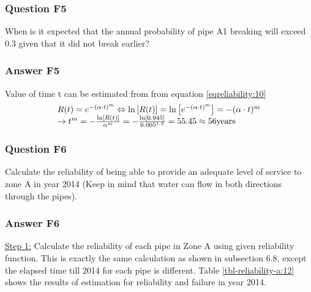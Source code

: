 \subsubsection{Question F5}
When is it expected that the annual probability of pipe A1 breaking will exceed
0.3 given that it did not break earlier?

\subsubsection{Answer F5}
Value of time t can be estimated from from equation \eqref{eqreliability:10}
\[
\begin{array}{l}
R(t) = {e^{ - {{(\alpha  \cdot t)}^m}}} \Leftrightarrow \ln \left[ {R(t)}
\right] = \ln \left[ {{e^{ - {{(\alpha  \cdot t)}^m}}}} \right] =  - {(\alpha 
\cdot t)^m}\\
\to {t^m} =  - \frac{{\ln \left[ {R(t)} \right]}}{{{\alpha ^m}}} =  -
\frac{{\ln \left[ {0.945} \right]}}{{{{0.005}^{1.3}}}} = 55.45 \approx 56{\rm{
years}}
\end{array}
\]
\subsubsection{Question F6}
Calculate the reliability of being able to provide an adequate level of service
to zone A in year 2014 (Keep in mind that water can flow in both directions
through the pipes).
\subsubsection{Answer F6}
\underline{Step 1:} Calculate the reliability of each pipe in Zone A using given
reliability function. This is exactly the same calculation as shown in subsection
6.8, except the elapsed time till 2014 for each pipe is different. Table
\ref{tbl-reliability-a:12} shows the results of estimation for reliability and failure in year
2014.

